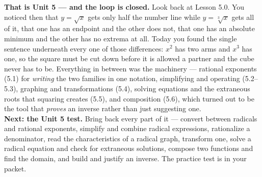 \documentclass[10pt]{article}
\begin{document}
\begin{spiralbox}
\textbf{That is Unit 5 --- and the loop is closed.} Look back at Lesson 5.0. You noticed then that
$y=\sqrt{x}$ gets only half the number line while $y=\sqrt[3]{x}$ gets all of it, that one has an
endpoint and the other does not, that one has an absolute minimum and the other has no extrema at
all. Today you found the single sentence underneath every one of those differences: $x^{2}$ has two
arms and $x^{3}$ has one, so the square must be cut down before it is allowed a partner and the cube
never has to be. Everything in between was the machinery --- rational exponents (5.1) for
\emph{writing} the two families in one notation, simplifying and operating (5.2--5.3), graphing and
transformations (5.4), solving equations and the extraneous roots that squaring creates (5.5), and
composition (5.6), which turned out to be the tool that \emph{proves} an inverse rather than just
suggesting one.
\\[4pt]
\textbf{Next: the Unit 5 test.} Bring back every part of it --- convert between radicals and rational
exponents, simplify and combine radical expressions, rationalize a denominator, read the
characteristics of a radical graph, transform one, solve a radical equation and check for
extraneous solutions, compose two functions and find the domain, and build and justify an inverse.
The practice test is in your packet.
\end{spiralbox}
\end{document}
